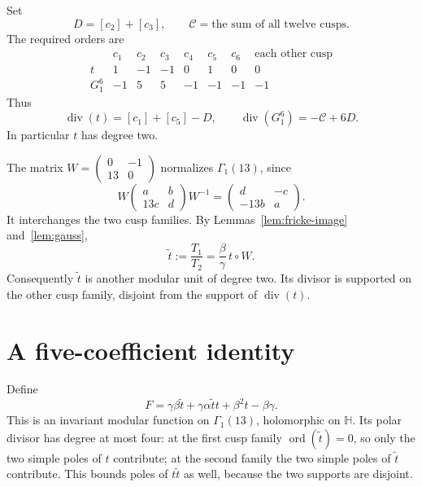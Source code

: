 \documentclass[11pt]{amsart}
\theoremstyle{remark}
\DeclareMathOperator{\ord}{ord}
\DeclareMathOperator{\divisor}{div}
\newcommand{\HH}{\mathbb H}
\newcommand{\ttil}{\widetilde t}
\begin{document}
Set
\[
 D=[c_2]+[c_3],\qquad \mathcal C=\text{the sum of all twelve cusps}.
\]
The required orders are
\begin{equation}\label{eq:order-table}
 \begin{array}{c|rrrrrr|c}
 &c_1&c_2&c_3&c_4&c_5&c_6&\text{each other cusp}\\\hline
 t&1&-1&-1&0&1&0&0\\
 G_1^6&-1&5&5&-1&-1&-1&-1
 \end{array}
\end{equation}
Thus
\begin{equation}\label{eq:divisors}
 \divisor(t)=[c_1]+[c_5]-D,\qquad
 \divisor(G_1^6)=-\mathcal C+6D.
\end{equation}
In particular $t$ has degree two.

The matrix $W=\left(\begin{smallmatrix}0&-1\\13&0\end{smallmatrix}\right)$ normalizes $\Gamma_1(13)$, since
\[
 W\begin{pmatrix}a&b\\13c&d\end{pmatrix}W^{-1}
 =\begin{pmatrix}d&-c\\-13b&a\end{pmatrix}.
\]
It interchanges the two cusp families. By Lemmas~\ref{lem:fricke-image} and~\ref{lem:gauss},
\begin{equation}\label{eq:tW}
 \ttil:=\frac{T_1}{T_2}=\frac{\beta}{\gamma}\,t\circ W.
\end{equation}
Consequently $\ttil$ is another modular unit of degree two. Its divisor is supported on the other cusp family, disjoint from the support of $\divisor(t)$.

\section{A five-coefficient identity}
Define
\begin{equation}\label{eq:F}
 F=\gamma\beta\ttil+\gamma\alpha\ttil t+\beta^2t-\beta\gamma.
\end{equation}
This is an invariant modular function on $\Gamma_1(13)$, holomorphic on $\HH$. Its polar divisor has degree at most four: at the first cusp family $\ord(\ttil)=0$, so only the two simple poles of $t$ contribute; at the second family the two simple poles of $\ttil$ contribute. This bounds poles of $t\ttil$ as well, because the two supports are disjoint.
\end{document}
